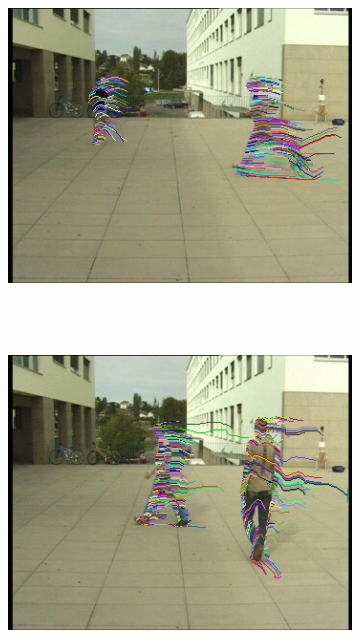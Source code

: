 \begin{figure}[t]
\begin{subfigure}[b]{0.24\textwidth}
                \includegraphics[width=\textwidth, trim=6 0 5 1, clip]{fig6.jpg}
		\caption{~}
                \label{fig:cp02_videoCapture2}
        \end{subfigure}%
        ~ %
        \begin{subfigure}[b]{0.24\textwidth}
                \centering
                \includegraphics[width=\textwidth, trim=6 0 5 1, clip]{fig7.jpg}
                \caption{~}
                \label{fig:cp02_videoCapture3}
        \end{subfigure}%

\end{figure}
